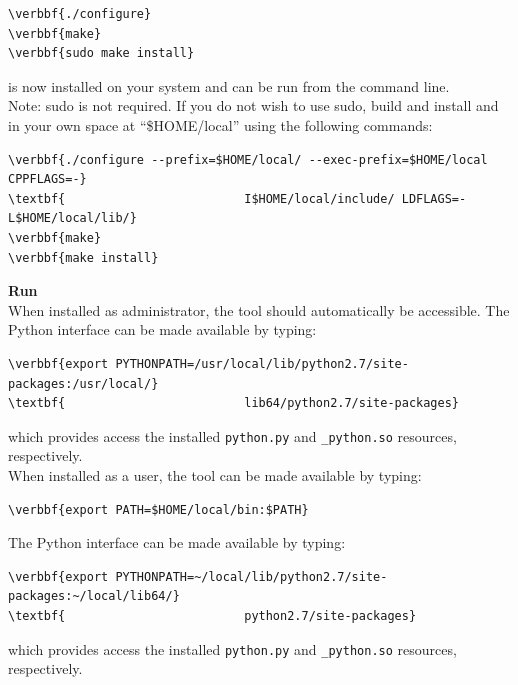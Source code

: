 \documentclass[11pt,fleqn]{article} %
\begin{document}
\begin{Verbatim}[commandchars=\\\{\}]
\verbbf{./configure}
\verbbf{make}
\verbbf{sudo make install}
\end{Verbatim}
\hdb is now installed on your system and can be run from the command line. \\

Note: sudo is not required. If you do not wish to use sudo,  build and install \hdb and \bulk in your own space at ``\$HOME/local'' using the following commands:
\begin{Verbatim}[commandchars=\\\{\}]
\verbbf{./configure --prefix=$HOME/local/ --exec-prefix=$HOME/local CPPFLAGS=-}
\textbf{                         I$HOME/local/include/ LDFLAGS=-L$HOME/local/lib/}
\verbbf{make}
\verbbf{make install}
\end{Verbatim}

\textbf{Run \hdb}\\
When installed as administrator, the \hdb tool should automatically be accessible. The \hdb Python interface can be made available by typing:
\begin{Verbatim}[commandchars=\\\{\}]
\verbbf{export PYTHONPATH=/usr/local/lib/python2.7/site-packages:/usr/local/}
\textbf{                         lib64/python2.7/site-packages}
\end{Verbatim}

which provides access the installed \verb+python.py+ and \verb+_python.so+ resources, respectively.\\

When installed as a user, the \hdb tool can be made available by typing:
\begin{Verbatim}[commandchars=\\\{\}]
\verbbf{export PATH=$HOME/local/bin:$PATH}
\end{Verbatim}

The \hdb Python interface can be made available by typing:
\begin{Verbatim}[commandchars=\\\{\}]
\verbbf{export PYTHONPATH=~/local/lib/python2.7/site-packages:~/local/lib64/}
\textbf{                         python2.7/site-packages}
\end{Verbatim}

which provides access the installed \verb+python.py+ and \verb+_python.so+ resources, respectively.\\
\end{document}
